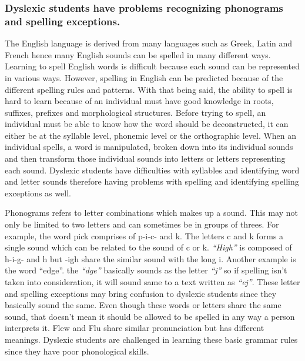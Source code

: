 \documentclass[letterpaper, 12pt, oneside]{book}
\begin{document}
\subsubsection{Dyslexic students have problems recognizing phonograms and spelling exceptions.}

	The English language is derived from many languages such as Greek, Latin and French hence many English sounds can be spelled in many different ways. Learning to spell English words is difficult because each sound can be represented in various ways. However, spelling in English can be predicted  because of the different spelling rules and patterns. With that being said, the ability to spell is hard to learn because of an individual must have good knowledge in roots, suffixes, prefixes and morphological structures. Before trying to spell, an individual must be able to know how the word should be deconstructed, it can either be at the syllable level, phonemic level or the orthographic level. When an individual spells, a word is manipulated, broken down into its individual sounds and then transform those individual sounds into letters or letters representing each sound. Dyslexic students have difficulties with syllables and identifying word and letter sounds therefore having problems with spelling and identifying spelling exceptions as well.\newline

	Phonograms refers to letter combinations which makes up a sound. This may not only be limited to two letters and can sometimes be in groups of threes. For example, the word pick comprises of p-i-c- and k. The letters c and k forms a single sound which can be related to the sound of c or k. \textit{“High”} is composed of h-i-g- and h but -igh share the similar sound with the long i. Another example is the word “edge”. the \textit{“dge”} basically sounds as the letter \textit{“j”} so if spelling isn’t taken into consideration, it will sound same to a text written as \textit{“ej”}. These letter and spelling exceptions may bring confusion to dyslexic students since they basically sound the same. Even though these words or letters share the same sound, that doesn’t mean it should be allowed to be spelled in any way a person interprets it. Flew and Flu share similar pronunciation but has different meanings. Dyslexic students are challenged in learning these basic grammar rules since they have poor phonological skills. %

\end{document}
